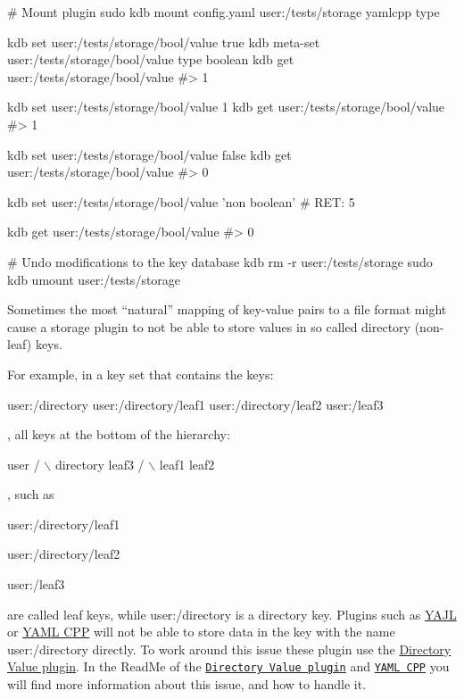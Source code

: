 \begin{DoxyCode}
# Mount plugin
sudo kdb mount config.yaml user:/tests/storage yamlcpp type

kdb set user:/tests/storage/bool/value true
kdb meta-set user:/tests/storage/bool/value type boolean
kdb get user:/tests/storage/bool/value
#> 1

kdb set user:/tests/storage/bool/value 1
kdb get user:/tests/storage/bool/value
#> 1

kdb set user:/tests/storage/bool/value false
kdb get user:/tests/storage/bool/value
#> 0

kdb set user:/tests/storage/bool/value 'non boolean'
# RET: 5

kdb get user:/tests/storage/bool/value
#> 0

# Undo modifications to the key database
kdb rm -r user:/tests/storage
sudo kdb umount user:/tests/storage
\end{DoxyCode}


Sometimes the most “natural” mapping of key-\/value pairs to a file format might cause a storage plugin to not be able to store values in so called directory (non-\/leaf) keys.

For example, in a key set that contains the keys\+:


\begin{DoxyCode}
user:/directory
user:/directory/leaf1
user:/directory/leaf2
user:/leaf3
\end{DoxyCode}


, all keys at the bottom of the hierarchy\+:


\begin{DoxyCode}
        user
      /      \(\backslash\)
  directory  leaf3
   /     \(\backslash\)
leaf1   leaf2
\end{DoxyCode}


, such as


\begin{DoxyItemize}
\item {\ttfamily user\+:/directory/leaf1}
\item {\ttfamily user\+:/directory/leaf2}
\item {\ttfamily user\+:/leaf3}
\end{DoxyItemize}

are called leaf keys, while {\ttfamily user\+:/directory} is a directory key. Plugins such as \hyperlink{autotoc_md786_src_plugins_yajl_README_md}{Y\+A\+JL} or \hyperlink{autotoc_md817_src_plugins_yamlcpp_README_md}{Y\+A\+ML C\+PP} will not be able to store data in the key with the name {\ttfamily user\+:/directory} directly. To work around this issue these plugin use the \hyperlink{autotoc_md173_src_plugins_directoryvalue_README_md}{Directory Value plugin}. In the Read\+Me of the \href{https://www.libelektra.org/plugins/directoryvalue}{\tt Directory Value plugin} and \href{https://www.libelektra.org/plugins/yamlcpp}{\tt Y\+A\+ML C\+PP} you will find more information about this issue, and how to handle it.

